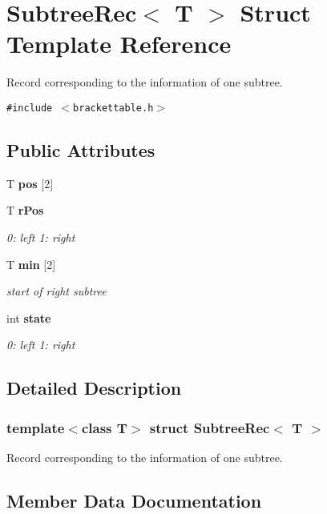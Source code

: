 \section{Subtree\-Rec$<$ T $>$ Struct Template Reference}
\label{structSubtreeRec}
Record corresponding to the information of one subtree.  


{\tt \#include $<$brackettable.h$>$}

\subsection*{Public Attributes}
\begin{CompactItemize}
\item 
T {\bf pos} [2]
\item 
T {\bf r\-Pos}
\begin{CompactList}\small\item\em 0: left 1: right \item\end{CompactList}\item 
T {\bf min} [2]
\begin{CompactList}\small\item\em start of right subtree \item\end{CompactList}\item 
int {\bf state}
\begin{CompactList}\small\item\em 0: left 1: right \item\end{CompactList}\end{CompactItemize}


\subsection{Detailed Description}
\subsubsection*{template$<$class T$>$ struct Subtree\-Rec$<$ T $>$}

Record corresponding to the information of one subtree. 



\subsection{Member Data Documentation}
